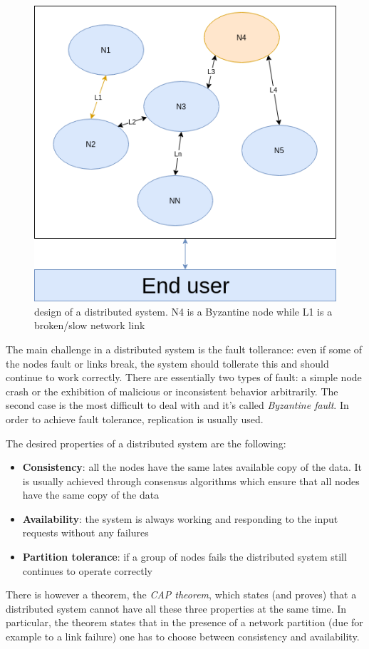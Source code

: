 \begin{figure}[!htb]
	\centering
	\includegraphics[width=0.6\linewidth]{img/distributed-system.png}
	\caption{design of a distributed system. N4 is a Byzantine node while L1 is a
  broken/slow network link}
	\label{fig:distributed-system}
\end{figure}

The main challenge in a distributed system is the fault tollerance: even if some
of the nodes fault or links break, the system should tollerate this and should
continue to work correctly. There are essentially two types of fault: a simple node
crash or the exhibition of malicious or inconsistent behavior arbitrarily. The
second case is the most difficult to deal with and it's called \emph{Byzantine
fault}. In order to achieve fault tolerance, replication is usually used.

The desired properties of a distributed system are the following:
\begin{itemize}
  \item \textbf{Consistency}: all the nodes have the same lates available copy of
  the data. It is usually achieved through consensus algorithms which ensure that
  all nodes have the same copy of the data
  \item \textbf{Availability}: the system is always working and responding to the
  input requests without any failures
  \item \textbf{Partition tolerance}: if a group of nodes fails the distributed
  system still continues to operate correctly
\end{itemize}
There is however a theorem, the \emph{CAP theorem}, which states (and proves)
that a distributed system cannot have all these three properties at the same time.
In particular, the theorem states that in the presence of a network partition (due
for example to a link failure) one has to choose between consistency and availability.



